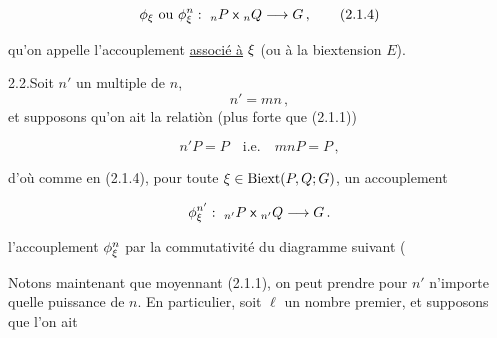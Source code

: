 
\[\phi_{\handwritten{\xi}}\ \text{ou}\ \phi_{\handwritten{\xi}}^n:\ {}_nP\;\mathsf{x}\;{}_nQ\handwritten{\longrightarrow}G\,,\tag*{(2.1.4)}\]

qu'on appelle l'accouplement \uline{associé à} $\xi$ (ou à la biextension $E$).

2.2.\quad Soit  $n'$ un multiple de $n$,
\[n'=mn\,,\]
et supposons qu'on ait la relatiòn (plus forte que (2.1.1))

\[n'P=P\quad\text{i.e.}\quad mnP=P\,,\tag*{(2.2.1)}\]

d'où comme en (2.1.4), pour toute $\xi\in\mathrm{Biext}(P,Q;G)$, un accouplement

\[\phi_{\handwritten{\xi}}^{n'}:\ {}_{n'}P\;\mathsf{x}\;{}_{n'}Q\handwritten{\longrightarrow}G\,.\]

 l'accouplement $\phi_{\xi}^n$  par la commutativité du diagramme suivant (



Notons maintenant que moyennant (2.1.1), on peut prendre pour $n'$ n'importe quelle puissance de $n$. En particulier, soit $\ell$ un nombre premier, et supposons que\deleted{\unsure{,}} l'on ait

